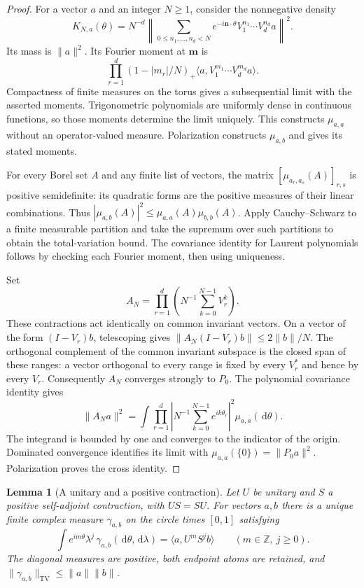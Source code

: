 \documentclass[11pt]{article}
\newtheorem{lemma}[theorem]{Lemma}
\theoremstyle{definition}
\theoremstyle{remark}
\numberwithin{equation}{section}
\begin{document}
\begin{proof}
For a vector $a$ and an integer $N\ge1$, consider the nonnegative density
\[
 K_{N,a}(\theta)=N^{-d}
 \left\|\sum_{0\le n_1,\ldots,n_d<N}
 e^{-i\mathbf n\cdot\theta}V_1^{n_1}\cdots V_d^{n_d}a\right\|^2.
\]
Its mass is $\|a\|^2$.  Its Fourier moment at $\mathbf m$ is
\[
 \prod_{r=1}^d(1-|m_r|/N)_+
       \langle a,V_1^{m_1}\cdots V_d^{m_d}a\rangle.
\]
Compactness of finite measures on the torus gives a subsequential
limit with the asserted moments.  Trigonometric polynomials are uniformly
dense in continuous functions, so those moments determine the limit
uniquely.  This constructs $\mu_{a,a}$ without an operator-valued measure.
Polarization constructs $\mu_{a,b}$ and gives its stated moments.

For every Borel set $A$ and any finite list of vectors, the matrix
$[\mu_{a_r,a_s}(A)]_{r,s}$ is positive semidefinite: its quadratic
forms are the positive measures of their linear combinations.
Thus $|\mu_{a,b}(A)|^2\le\mu_{a,a}(A)\mu_{b,b}(A)$.
Apply Cauchy--Schwarz to a finite measurable partition and take the
supremum over such partitions to obtain the total-variation bound.
The covariance identity for Laurent polynomials follows by checking
each Fourier moment, then using uniqueness.

Set
\[
 A_N=\prod_{r=1}^d\left(N^{-1}\sum_{k=0}^{N-1}V_r^k\right).
\]
These contractions act identically on common invariant vectors.
On a vector of the form $(I-V_r)b$, telescoping gives
$\|A_N(I-V_r)b\|\le2\|b\|/N$.
The orthogonal complement of the common invariant subspace is the
closed span of these ranges: a vector orthogonal to every range is
fixed by every $V_r^*$ and hence by every $V_r$.  Consequently $A_N$
converges strongly to $P_0$.  The polynomial covariance identity gives
\[
 \|A_Na\|^2
 =\int\prod_{r=1}^d\left|N^{-1}\sum_{k=0}^{N-1}e^{ik\theta_r}\right|^2
          \mu_{a,a}(\,\mathrm d\theta).
\]
The integrand is bounded by one and converges to the indicator of the
origin.  Dominated convergence identifies its limit with
$\mu_{a,a}(\{0\})=\|P_0a\|^2$.  Polarization proves the cross identity.
\end{proof}

\begin{lemma}[A unitary and a positive contraction]\label{spectra:transfer}
Let $U$ be unitary and $S$ a positive self-adjoint contraction, with
$US=SU$.  For vectors $a,b$ there is a unique finite complex measure
$\gamma_{a,b}$ on the circle times $[0,1]$ satisfying
\[
 \int e^{im\theta}\lambda^j\,\gamma_{a,b}(\,\mathrm d\theta,\,\mathrm d\lambda)
    =\langle a,U^mS^jb\rangle
       \qquad(m\in\mathbb Z,\ j\ge0).
\]
The diagonal measures are positive, both endpoint atoms are retained,
and $\|\gamma_{a,b}\|_{\mathrm{TV}}\le\|a\|\|b\|$.
\end{lemma}
\end{document}
